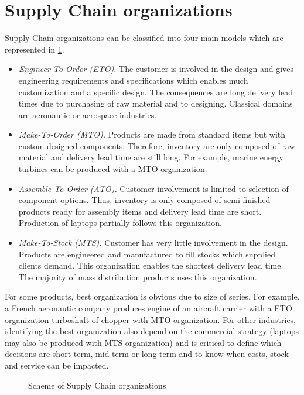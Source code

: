 \section{Supply Chain organizations}


Supply Chain organizations can be classified into four main models \cite{arnold2007} which are represented in \cref{fig:supply-chain-models}.
\begin{itemize}
  \item \emph{Engineer-To-Order (ETO).}
  The customer is involved in the design and gives engineering requirements and specifications which enables much customization and a specific design.
  The consequences are long delivery lead times due to purchasing of raw material and to designing.
  Classical domains are aeronautic or aerospace industries.

  \item \emph{Make-To-Order (MTO).}
  Products are made from standard items but with custom-designed components.
  Therefore, inventory are only composed of raw material and delivery lead time are still long.
  For example, marine energy turbines can be produced with a MTO organization.

  \item \emph{Assemble-To-Order (ATO).}
  Customer involvement is limited to selection of component options.
  Thus, inventory is only composed of semi-finished products ready for assembly items and delivery lead time are short.
  Production of laptops partially follows this organization.

  \item \emph{Make-To-Stock (MTS).}
  Customer has very little involvement in the design.
  Products are engineered and manufactured to fill stocks which supplied clients demand.
  This organization enables the shortest delivery lead time.
  The majority of mass distribution products uses this organization.
\end{itemize}
For some products, best organization is obvious due to size of series.
For example, a French aeronautic company produces engine of an aircraft carrier with a ETO organization  turboshaft of chopper with MTO organization.
For other industries, identifying the best organization also depend on the commercial strategy (laptops may also be produced with MTS organization) and is critical to define which decisions are short-term, mid-term or long-term and to know when costs, stock and service can be impacted.


\begin{figure}[h]
  \centering
  \caption{Scheme of Supply Chain organizations}
  \label{fig:supply-chain-models}
\end{figure}



